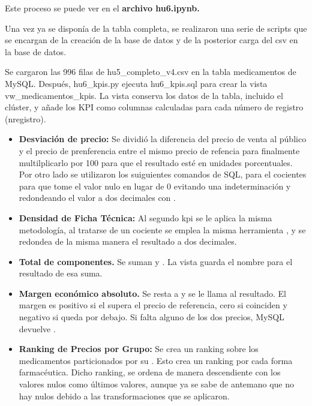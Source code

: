 \documentclass[11pt,a4paper]{article}
\begin{document}
Este proceso se puede ver en el \textbf{archivo hu6.ipynb.}

Una vez ya se disponía de la tabla completa, se realizaron una serie de scripts que se
encargan de la creación de la base de datos y de la posterior carga del csv en la base de datos.

Se cargaron las 996 filas de hu5\_completo\_v4.csv en la tabla medicamentos de MySQL.
Después, hu6\_kpis.py ejecuta hu6\_kpis.sql para crear la vista vw\_medicamentos\_kpis. La vista
conserva los datos de la tabla, incluido el clúster, y añade los KPI como columnas calculadas
para cada número de registro (nregistro).
\begin{itemize}
  \item \textbf{Desviación de precio:} Se dividió la diferencia del precio de venta al público y el precio
        de prenferencia entre el mismo precio de refencia para finalmente multilplicarlo por 100
        para que el resultado esté en unidades porcentuales. Por otro lado se utilizaron los
        suiguientes comandos de SQL,  para el cocientes para que tome el valor
        nulo en lugar de 0 evitando una indeterminación y redondeando el valor a dos
        decimales con .
  \item \textbf{Densidad de Ficha Técnica:} Al segundo kpi se le aplica la misma metodología, al
        tratarse de un cociente se emplea la misma herramienta , y se redondea de la
        misma manera el resultado a dos decimales.
  \item \textbf{Total de componentes.} Se suman  y . La vista
        guarda el nombre  para el resultado de esa suma.
  \item \textbf{Margen económico absoluto.} Se resta  a  y se le llama 
         al resultado. El margen es positivo si el  supera el
        precio de referencia, cero si coinciden y negativo si queda por debajo. Si falta alguno de
        los dos precios, MySQL devuelve .
  \item \textbf{Ranking de Precios por Grupo:} Se crea un ranking sobre los medicamentos
        particionados por su . Esto crea un ranking por cada
        forma farmacéutica. Dicho ranking, se ordena de manera descendiente con los valores
        nulos como últimos valores, aunque ya se sabe de antemano que no hay nulos debido a
        las transformaciones que se aplicaron.
\end{itemize}
\newpage
\end{document}
